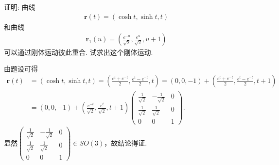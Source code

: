 \documentclass[../../main.tex]{subfiles}%
\begin{document}
\begin{example}
证明: 曲线
\begin{align*}
\bm{r}(t) = (\cosh t, \sinh t, t)
\end{align*}
和曲线
\begin{align*}
\bm{r}_1(u) = \left( \frac{e^{-u}}{\sqrt{2}}, \frac{e^{u}}{\sqrt{2}}, u + 1 \right)
\end{align*}
可以通过刚体运动彼此重合. 试求出这个刚体运动.
\end{example}
\begin{solution}

由题设可得
\begin{align*}
\bm{r}(t)&=(\cosh t,\sinh t,t)=\left(\frac{e^t+e^{-t}}{2},\frac{e^t-e^{-t}}{2},t\right)=(0,0,-1)+\left(\frac{e^t+e^{-t}}{2},\frac{e^t-e^{-t}}{2},t+1\right)\\
&=(0,0,-1)+\left(\frac{e^{-t}}{\sqrt{2}},\frac{e^t}{\sqrt{2}},t+1\right)\begin{pmatrix}
\frac{1}{\sqrt{2}}&-\frac{1}{\sqrt{2}}&0\\
\frac{1}{\sqrt{2}}&\frac{1}{\sqrt{2}}&0\\
0&0&1
\end{pmatrix}.
\end{align*}
显然$\begin{pmatrix}
\frac{1}{\sqrt{2}}&-\frac{1}{\sqrt{2}}&0\\
\frac{1}{\sqrt{2}}&\frac{1}{\sqrt{2}}&0\\
0&0&1
\end{pmatrix}\in SO(3)$，故结论得证.

\end{solution}
\end{document}
